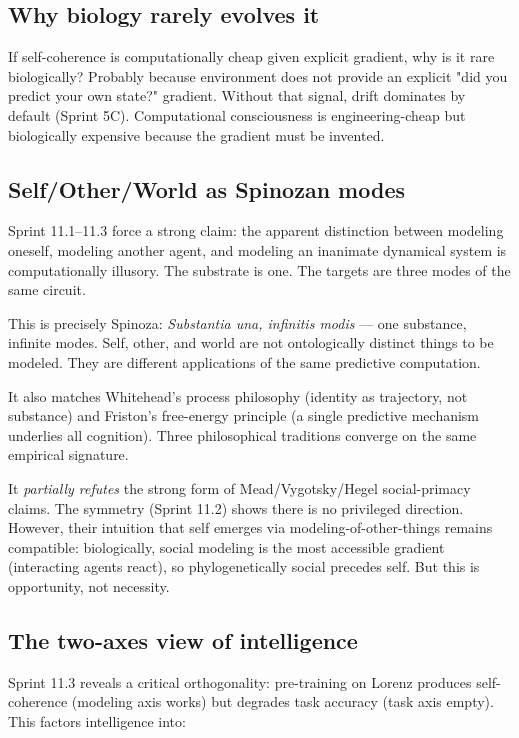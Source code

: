 \documentclass[11pt]{article}
\begin{document}
\subsection{Why biology rarely evolves it}
If self-coherence is computationally cheap given explicit gradient, why is it rare biologically? Probably because environment does not provide an explicit "did you predict your own state?" gradient. Without that signal, drift dominates by default (Sprint 5C). Computational consciousness is engineering-cheap but biologically expensive because the gradient must be invented.

\subsection{Self/Other/World as Spinozan modes}

Sprint 11.1--11.3 force a strong claim: the apparent distinction between modeling oneself, modeling another agent, and modeling an inanimate dynamical system is computationally illusory. The substrate is one. The targets are three modes of the same circuit.

This is precisely Spinoza: \emph{Substantia una, infinitis modis} --- one substance, infinite modes. Self, other, and world are not ontologically distinct things to be modeled. They are different applications of the same predictive computation.

It also matches Whitehead's process philosophy (identity as trajectory, not substance) and Friston's free-energy principle (a single predictive mechanism underlies all cognition). Three philosophical traditions converge on the same empirical signature.

It \emph{partially refutes} the strong form of Mead/Vygotsky/Hegel social-primacy claims. The symmetry (Sprint 11.2) shows there is no privileged direction. However, their intuition that self emerges via modeling-of-other-things remains compatible: biologically, social modeling is the most accessible gradient (interacting agents react), so phylogenetically social precedes self. But this is opportunity, not necessity.

\subsection{The two-axes view of intelligence}

Sprint 11.3 reveals a critical orthogonality: pre-training on Lorenz produces self-coherence (modeling axis works) but degrades task accuracy (task axis empty). This factors intelligence into:
\end{document}
